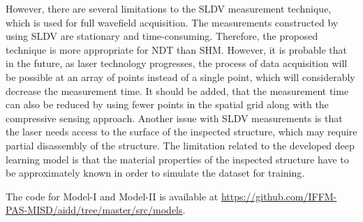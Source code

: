 \begin{sloppypar}
	However, there are several limitations to the SLDV measurement technique, which is used for full wavefield acquisition.
	The measurements constructed by using SLDV are stationary and time-consuming.
	Therefore, the proposed technique is more appropriate for NDT than SHM.
	However, it is probable that in the future, as laser technology progresses, the process of data acquisition will be possible at an array of points instead of a single point, which will considerably decrease the measurement time.
	It should be added, that the measurement time can also be reduced by using fewer points in the spatial grid along with the compressive sensing approach.
	Another issue with SLDV measurements is that the laser needs access to the surface of the inspected structure, which may require partial disassembly of the structure.
	The limitation related to the developed deep learning model is that the material properties of the inspected structure have to be approximately known in order to simulate the dataset for training.

	The code for Model-I and Model-II is available at \url{https://github.com/IFFM-PAS-MISD/aidd/tree/master/src/models}.
\end{sloppypar}
